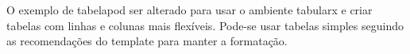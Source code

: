 \documentclass[12pt]{article}
\begin{document}
O exemplo de  tabelapod ser alterado para usar o ambiente tabularx e criar tabelas com linhas e colunas mais flexíveis. Pode-se usar  tabelas simples seguindo as recomendações do template para manter a formatação.



\end{document}
